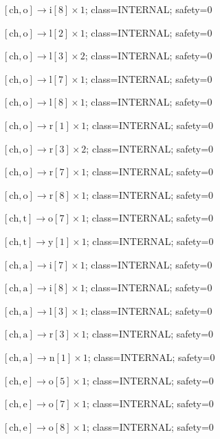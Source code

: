 \(\left[\mathrm{ch}, \mathrm{o}\right] \to \mathrm{i}[8] \times 1\); class=INTERNAL; safety=0\par
\(\left[\mathrm{ch}, \mathrm{o}\right] \to \mathrm{l}[2] \times 1\); class=INTERNAL; safety=0\par
\(\left[\mathrm{ch}, \mathrm{o}\right] \to \mathrm{l}[3] \times 2\); class=INTERNAL; safety=0\par
\(\left[\mathrm{ch}, \mathrm{o}\right] \to \mathrm{l}[7] \times 1\); class=INTERNAL; safety=0\par
\(\left[\mathrm{ch}, \mathrm{o}\right] \to \mathrm{l}[8] \times 1\); class=INTERNAL; safety=0\par
\(\left[\mathrm{ch}, \mathrm{o}\right] \to \mathrm{r}[1] \times 1\); class=INTERNAL; safety=0\par
\(\left[\mathrm{ch}, \mathrm{o}\right] \to \mathrm{r}[3] \times 2\); class=INTERNAL; safety=0\par
\(\left[\mathrm{ch}, \mathrm{o}\right] \to \mathrm{r}[7] \times 1\); class=INTERNAL; safety=0\par
\(\left[\mathrm{ch}, \mathrm{o}\right] \to \mathrm{r}[8] \times 1\); class=INTERNAL; safety=0\par
\(\left[\mathrm{ch}, \mathrm{t}\right] \to \mathrm{o}[7] \times 1\); class=INTERNAL; safety=0\par
\(\left[\mathrm{ch}, \mathrm{t}\right] \to \mathrm{y}[1] \times 1\); class=INTERNAL; safety=0\par
\(\left[\mathrm{ch}, \mathrm{a}\right] \to \mathrm{i}[7] \times 1\); class=INTERNAL; safety=0\par
\(\left[\mathrm{ch}, \mathrm{a}\right] \to \mathrm{i}[8] \times 1\); class=INTERNAL; safety=0\par
\(\left[\mathrm{ch}, \mathrm{a}\right] \to \mathrm{l}[3] \times 1\); class=INTERNAL; safety=0\par
\(\left[\mathrm{ch}, \mathrm{a}\right] \to \mathrm{r}[3] \times 1\); class=INTERNAL; safety=0\par
\(\left[\mathrm{ch}, \mathrm{a}\right] \to \mathrm{n}[1] \times 1\); class=INTERNAL; safety=0\par
\(\left[\mathrm{ch}, \mathrm{e}\right] \to \mathrm{o}[5] \times 1\); class=INTERNAL; safety=0\par
\(\left[\mathrm{ch}, \mathrm{e}\right] \to \mathrm{o}[7] \times 1\); class=INTERNAL; safety=0\par
\(\left[\mathrm{ch}, \mathrm{e}\right] \to \mathrm{o}[8] \times 1\); class=INTERNAL; safety=0\par
